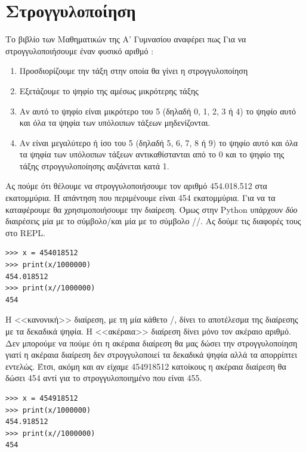 \documentclass[b5paper,11pt,twoside,openleft]{memoir}
\begin{document}
\section{Στρογγυλοποίηση}
Το βιβλίο των Μαθηματικών της Α' Γυμνασίου αναφέρει πως
Για να στρογγυλοποιήσουμε έναν φυσικό αριθμό :
\begin{enumerate}
  \item Προσδιορίζουμε την τάξη στην οποία θα γίνει η στρογγυλοποίηση
  \item Εξετάζουμε το ψηφίο της αμέσως μικρότερης τάξης
  \item Αν αυτό το ψηφίο είναι μικρότερο του 5 (δηλαδή 0, 1, 2, 3 ή 4) το ψηφίο αυτό και όλα τα ψηφία των υπόλοιπων τάξεων μηδενίζονται.
  \item Αν είναι μεγαλύτερο ή ίσο του 5 (δηλαδή 5, 6, 7, 8 ή 9) το ψηφίο αυτό και όλα τα ψηφία των υπόλοιπων τάξεων αντικαθίστανται από το 0 και το ψηφίο της τάξης στρογγυλοποίησης αυξάνεται κατά 1.
\end{enumerate}

Ας πούμε ότι θέλουμε να στρογγυλοποιήσουμε τον αριθμό 454.018.512 στα εκατομμύρια. Η απάντηση που περιμένουμε είναι 454 εκατομμύρια.
Για να τα καταφέρουμε θα χρησιμοποιήσουμε την διαίρεση. Όμως στην Python υπάρχουν \emph{δύο} διαιρέσεις μία με το σύμβολο/και μία με το σύμβολο //. Ας δούμε τις διαφορές τους στο REPL.
\begin{lstlisting}
>>> x = 454018512
>>> print(x/1000000)
454.018512
>>> print(x//1000000)
454
\end{lstlisting}
Η <<κανονική>> διαίρεση, με τη μία κάθετο /, δίνει το αποτέλεσμα της διαίρεσης με τα δεκαδικά ψηφία. Η <<ακέραια>> διαίρεση δίνει μόνο τον ακέραιο αριθμό. Δεν μπορούμε να πούμε ότι η ακέραια διαίρεση θα μας δώσει την στρογγυλοποίηση γιατί η ακέραια διαίρεση δεν στρογγυλοποιεί τα δεκαδικά ψηφία αλλά τα απορρίπτει εντελώς. Έτσι, ακόμη και αν είχαμε 454918512 κατοίκους η ακέραια διαίρεση θα δώσει 454 αντί για το στρογγυλοποιημένο που είναι 455.
\begin{lstlisting}
>>> x = 454918512
>>> print(x/1000000)
454.918512
>>> print(x//1000000)
454
\end{lstlisting}
\end{document}
